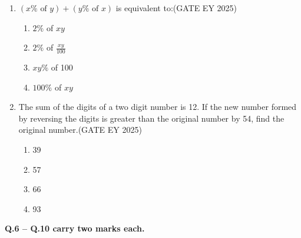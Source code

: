 \begin{enumerate}
\begin{quote}
\underline{\hspace{3cm}} \quad \underline{\hspace{3cm}} \quad is a will, \quad \underline{\hspace{3cm}} \quad is a way.
\end{quote}
\hfill {(GATE EY 2025)}
\begin{multicols}{2}
\begin{enumerate}
\item Wear, there, their
\item Were, their, there
\item Where, there, there
\item Where, their, their
\end{enumerate}
\end{multicols}



\item $(x \% \text{ of } y) + (y \% \text{ of } x)$ is equivalent to:\hfill {(GATE EY 2025)}

\begin{multicols}{2}
\begin{enumerate}
\item $2 \%$ of $xy$
\item $2 \%$ of $\frac{xy}{100}$
\item $xy \%$ of 100
\item $100 \%$ of $xy$
\end{enumerate}
\end{multicols}



\item The sum of the digits of a two digit number is 12. If the new number formed by reversing the digits is greater than the original number by 54, find the original number.\hfill {(GATE EY 2025)}

\begin{multicols}{2}
\begin{enumerate}
\item 39
\item 57
\item 66
\item 93
\end{enumerate}

\end{multicols}

\end{enumerate}


\noindent \textbf{Q.6 -- Q.10 carry two marks each.}

